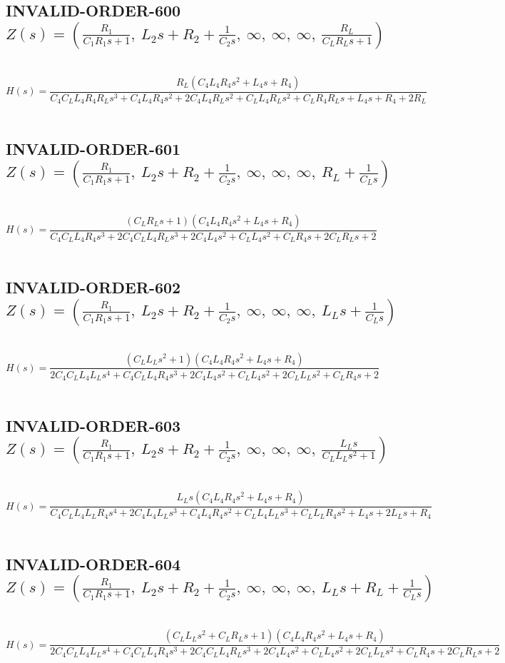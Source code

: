\documentclass{article}
\begin{document}
\subsection{INVALID-ORDER-600 $Z(s) = \left( \frac{R_{1}}{C_{1} R_{1} s + 1}, \  L_{2} s + R_{2} + \frac{1}{C_{2} s}, \  \infty, \  \infty, \  \infty, \  \frac{R_{L}}{C_{L} R_{L} s + 1}\right)$ } \ 
\textbf{\[H(s) = \frac{R_{L} \left(C_{4} L_{4} R_{4} s^{2} + L_{4} s + R_{4}\right)}{C_{4} C_{L} L_{4} R_{4} R_{L} s^{3} + C_{4} L_{4} R_{4} s^{2} + 2 C_{4} L_{4} R_{L} s^{2} + C_{L} L_{4} R_{L} s^{2} + C_{L} R_{4} R_{L} s + L_{4} s + R_{4} + 2 R_{L}}\] } \ 
\subsection{INVALID-ORDER-601 $Z(s) = \left( \frac{R_{1}}{C_{1} R_{1} s + 1}, \  L_{2} s + R_{2} + \frac{1}{C_{2} s}, \  \infty, \  \infty, \  \infty, \  R_{L} + \frac{1}{C_{L} s}\right)$ } \ 
\textbf{\[H(s) = \frac{\left(C_{L} R_{L} s + 1\right) \left(C_{4} L_{4} R_{4} s^{2} + L_{4} s + R_{4}\right)}{C_{4} C_{L} L_{4} R_{4} s^{3} + 2 C_{4} C_{L} L_{4} R_{L} s^{3} + 2 C_{4} L_{4} s^{2} + C_{L} L_{4} s^{2} + C_{L} R_{4} s + 2 C_{L} R_{L} s + 2}\] } \ 
\subsection{INVALID-ORDER-602 $Z(s) = \left( \frac{R_{1}}{C_{1} R_{1} s + 1}, \  L_{2} s + R_{2} + \frac{1}{C_{2} s}, \  \infty, \  \infty, \  \infty, \  L_{L} s + \frac{1}{C_{L} s}\right)$ } \ 
\textbf{\[H(s) = \frac{\left(C_{L} L_{L} s^{2} + 1\right) \left(C_{4} L_{4} R_{4} s^{2} + L_{4} s + R_{4}\right)}{2 C_{4} C_{L} L_{4} L_{L} s^{4} + C_{4} C_{L} L_{4} R_{4} s^{3} + 2 C_{4} L_{4} s^{2} + C_{L} L_{4} s^{2} + 2 C_{L} L_{L} s^{2} + C_{L} R_{4} s + 2}\] } \ 
\subsection{INVALID-ORDER-603 $Z(s) = \left( \frac{R_{1}}{C_{1} R_{1} s + 1}, \  L_{2} s + R_{2} + \frac{1}{C_{2} s}, \  \infty, \  \infty, \  \infty, \  \frac{L_{L} s}{C_{L} L_{L} s^{2} + 1}\right)$ } \ 
\textbf{\[H(s) = \frac{L_{L} s \left(C_{4} L_{4} R_{4} s^{2} + L_{4} s + R_{4}\right)}{C_{4} C_{L} L_{4} L_{L} R_{4} s^{4} + 2 C_{4} L_{4} L_{L} s^{3} + C_{4} L_{4} R_{4} s^{2} + C_{L} L_{4} L_{L} s^{3} + C_{L} L_{L} R_{4} s^{2} + L_{4} s + 2 L_{L} s + R_{4}}\] } \ 
\subsection{INVALID-ORDER-604 $Z(s) = \left( \frac{R_{1}}{C_{1} R_{1} s + 1}, \  L_{2} s + R_{2} + \frac{1}{C_{2} s}, \  \infty, \  \infty, \  \infty, \  L_{L} s + R_{L} + \frac{1}{C_{L} s}\right)$ } \ 
\textbf{\[H(s) = \frac{\left(C_{L} L_{L} s^{2} + C_{L} R_{L} s + 1\right) \left(C_{4} L_{4} R_{4} s^{2} + L_{4} s + R_{4}\right)}{2 C_{4} C_{L} L_{4} L_{L} s^{4} + C_{4} C_{L} L_{4} R_{4} s^{3} + 2 C_{4} C_{L} L_{4} R_{L} s^{3} + 2 C_{4} L_{4} s^{2} + C_{L} L_{4} s^{2} + 2 C_{L} L_{L} s^{2} + C_{L} R_{4} s + 2 C_{L} R_{L} s + 2}\] } \ 
\end{document}
